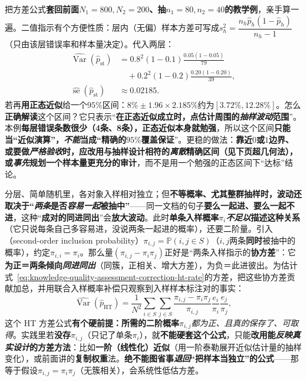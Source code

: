 把方差公式\textbf{套回前面$N_1=800,N_2=200$、抽$n_1=80,n_2=40$的教学例}，亲手算一遍。二值指示有个方便性质：层内（无偏）样本方差可写成$s_h^2=\dfrac{n_h\widehat p_h(1-\widehat p_h)}{n_h-1}$（只由该层错误率和样本量决定）。代入两层：
\[
  \begin{aligned}
    \widehat{\operatorname{Var}}(\widehat p_{\mathrm{st}})
    &=
    0.8^2(1-0.1)\frac{0.05(1-0.05)}{79}\\
    &\quad+0.2^2(1-0.2)\frac{0.20(1-0.20)}{39},\\
    \widehat{\operatorname{se}}(\widehat p_{\mathrm{st}})
    &\approx 0.02185.
  \end{aligned}
\]
若再\textbf{用正态近似}给一个$95\%$区间：$8\%\pm1.96\times2.185\%$约为$[3.72\%,12.28\%]$。怎么\textbf{正确解读}这个区间？它只表示“\textbf{在正态近似成立时，点估计周围的\emph{抽样波动}范围}”。本例\textbf{每层错误条数很少（4条、8条），正态近似本身就勉强}，所以这个区间\textbf{只能当“近似演算”，\emph{不能}当成“精确的$95\%$覆盖保证}”。更稳的做法：\textbf{靠近$0$或$1$边界、或要做\emph{严格验收}时，应改用与抽样设计相符的\emph{离散}精确区间（见下页超几何法），或\emph{事先}规划一个样本量更充分的审计}，而不是用一个勉强的正态区间下“达标”结论。

分层、简单随机里，各对象入样相对独立；但\textbf{不等概率、尤其整群抽样时，波动还取决于“\emph{两条}是否\emph{容易一起}被抽中”}——同一文档的句子\textbf{要么一起进、要么一起不进}，这种“\textbf{成对的同进同出}”会\textbf{放大波动}。此时\textbf{单条入样概率$\pi_i$\emph{不足以}描述这种关系}（它只说每条自己多容易进，没说两条一起进的概率），还要二阶量。引入（second-order inclusion probability）$\pi_{i,j}=\mathbb{P}(i,j\in S)$（$i,j$两条\textbf{同时}被抽中的概率），约定$\pi_{i,i}=\pi_i$。那么量$(\pi_{i,j}-\pi_i\pi_j)$正好是“两条入样指示的\textbf{协方差}”：它\textbf{为正＝两条倾向\emph{同进同出}}（同簇，正相关、增大方差），为负＝此进彼出。为估计式~\eqref{eq:knowledge-quality-assessment-correction-ht-rate}的方差，把这些协方差贡献加总，并用联合入样概率补偿只观察到入样样本标注对的事实：
\begin{equation}
  \widehat{\operatorname{Var}}(\widehat p_{\mathrm{HT}})
  =
  \frac{1}{N^2}
  \sum_{i\in S}\sum_{j\in S}
  \frac{\pi_{i,j}-\pi_i\pi_j}{\pi_{i,j}}
  \frac{e_i}{\pi_i}\frac{e_j}{\pi_j},
  \label{eq:knowledge-quality-assessment-correction-ht-variance}
\end{equation}
这个 HT 方差公式\textbf{有个硬前提：所需的二阶概率$\pi_{i,j}$}\emph{都为正、且真的保存了、可取得}。实践里若\textbf{没存$\pi_{i,j}$}（只记了单条$\pi_i$），就\textbf{不能硬套这个公式}，只能\textbf{改用能\emph{反映真实设计}的方差方法}：比如\textbf{一阶（线性化）近似}（用一阶泰勒展开近似估计量的抽样变化），或前面讲的\textbf{复制权重}法。\textbf{绝不能图省事\emph{退回}“把样本当独立”的公式}——那等于假设$\pi_{i,j}=\pi_i\pi_j$（无簇相关），会系统性低估方差。

